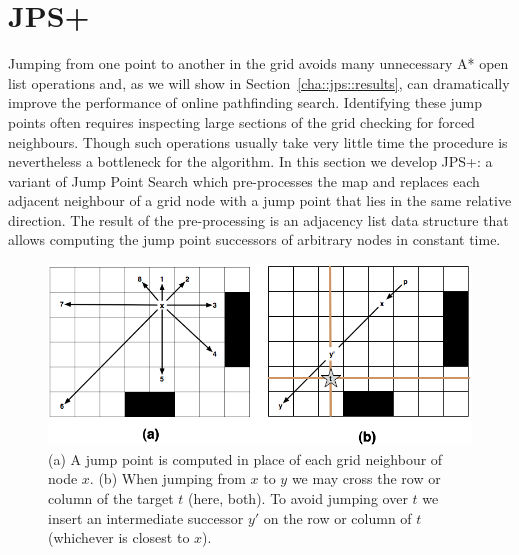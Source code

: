 \section{JPS+}
Jumping from one point to another in the grid avoids many unnecessary A* open
list operations and, as we will show in Section~\ref{cha::jps::results}, can
dramatically improve the performance of online pathfinding search.
Identifying these jump points often requires inspecting large sections of the
grid checking for forced neighbours. Though such operations usually take very
little time the procedure is nevertheless a bottleneck for the algorithm.  In
this section we develop JPS+: a variant of Jump Point Search which
pre-processes the map and replaces each adjacent neighbour of a grid node with
a jump point that lies in the same relative direction. The result of the
pre-processing is an adjacency list data structure that allows computing the
jump point successors of arbitrary nodes in constant time.


\begin{figure}[tb]
       \begin{center}
		   \includegraphics[width=0.95\columnwidth]
			{chapter_jps/diagrams/preproc.png}
       \end{center}
	\vspace{-3pt}
       \caption{(a) A jump point is computed in place of each grid neighbour of node $x$.
		(b) When jumping from $x$ to $y$ we may cross the row or column of the target $t$ (here, both). 
To avoid jumping over $t$ we insert an intermediate successor $y'$ on the row or column of $t$ (whichever is closest to $x$).}

       \label{fig:preproc}
\end{figure}

